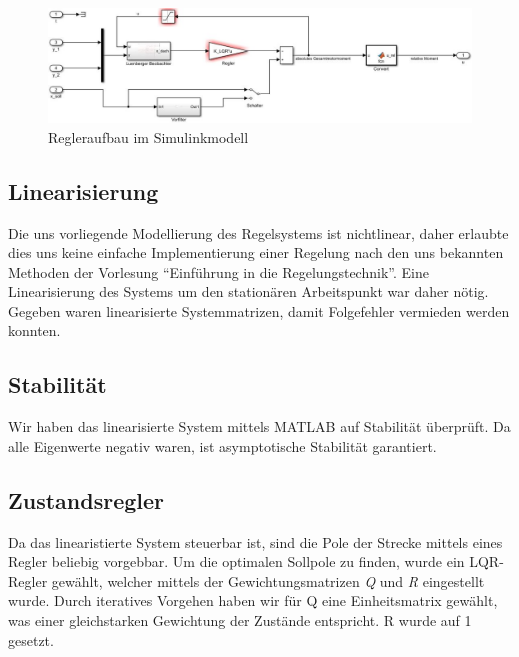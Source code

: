 \documentclass[pdf]{ifacconf}
\begin{document}
\begin{figure}[h]	
\centerline{\includegraphics[width=\linewidth]{Bilder/Regler.jpg}}
	\label{fig:Regleraufbau}
	\caption{Regleraufbau im Simulinkmodell}
\end{figure}


	\subsection{Linearisierung}
	Die uns vorliegende Modellierung des Regelsystems ist nichtlinear, daher erlaubte dies uns keine einfache Implementierung einer Regelung nach den uns bekannten Methoden der Vorlesung ``Einführung in die Regelungstechnik''. 
	Eine Linearisierung des Systems um den stationären Arbeitspunkt war daher nötig. Gegeben waren linearisierte Systemmatrizen, damit Folgefehler vermieden werden konnten. 
	
	\subsection{Stabilität}
	Wir haben das linearisierte System mittels MATLAB auf Stabilität überprüft. Da alle Eigenwerte negativ waren, ist asymptotische Stabilität garantiert.
	
	\subsection{Zustandsregler}
	Da das linearistierte System steuerbar ist, sind die Pole der Strecke mittels eines Regler 			beliebig vorgebbar. Um die optimalen Sollpole zu finden, wurde ein LQR-Regler gewählt, 				welcher mittels der Gewichtungsmatrizen \textit{Q} und \textit{R} eingestellt wurde.
	Durch iteratives Vorgehen haben wir für Q eine Einheitsmatrix gewählt, was einer   					gleichstarken Gewichtung der Zustände entspricht. R wurde auf 1 gesetzt.
	


\end{document}
